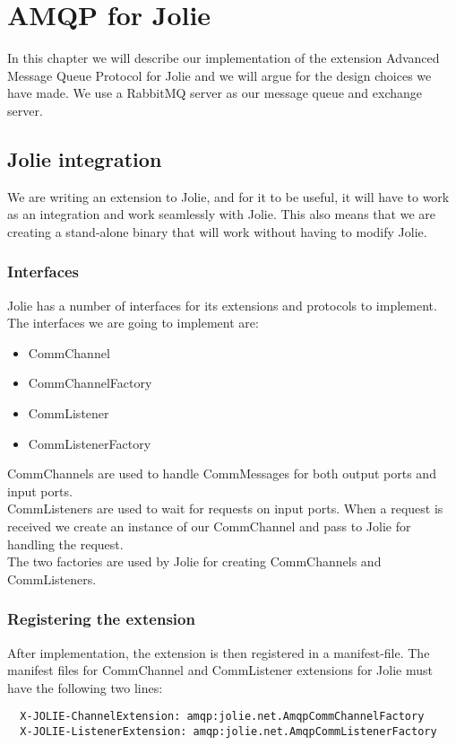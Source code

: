 \section{AMQP for Jolie}
In this chapter we will describe our implementation of the extension Advanced Message Queue Protocol for Jolie and we will argue for the design choices we have made. We use a RabbitMQ\cite{RabbitMQ} server as our message queue and exchange server.

\subsection{Jolie integration}
We are writing an extension to Jolie, and for it to be useful, it will have to work as an integration and work seamlessly with Jolie. This also means that we are creating a stand-alone binary that will work without having to modify Jolie.

\subsubsection{Interfaces}
Jolie has a number of interfaces for its extensions and protocols to implement. The interfaces we are going to implement are:
\begin{itemize}
\item CommChannel
\item CommChannelFactory
\item CommListener
\item CommListenerFactory
\end{itemize}

CommChannels are used to handle CommMessages for both output ports and input ports.\\
CommListeners are used to wait for requests on input ports. When a request is received we create an instance of our CommChannel and pass to Jolie for handling the request.\\
The two factories are used by Jolie for creating CommChannels and CommListeners.

\subsubsection{Registering the extension}
After implementation, the extension is then registered in a manifest-file. The manifest files for CommChannel and CommListener extensions for Jolie must have the following two lines:
\begin{lstlisting}
  X-JOLIE-ChannelExtension: amqp:jolie.net.AmqpCommChannelFactory
  X-JOLIE-ListenerExtension: amqp:jolie.net.AmqpCommListenerFactory
\end{lstlisting}

